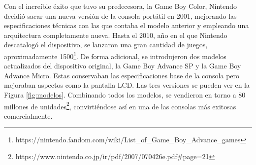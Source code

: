 Con el increíble éxito que tuvo su predecesora, la Game Boy Color, Nintendo decidió sacar una nueva versión de la consola portátil en 2001, mejorando las especificaciones técnicas con las que contaba el modelo anterior y empleando una arquitectura completamente nueva. Hasta el 2010, año en el que Nintendo descatalogó el dispositivo, se lanzaron una gran cantidad de juegos, aproximadamente 1500\footnote{https://nintendo.fandom.com/wiki/List\_of\_Game\_Boy\_Advance\_games}. De forma adicional, se introdujeron dos modelos actualizados del dispositivo original, la Game Boy Advance SP y la Game Boy Advance Micro. Estas conservaban las especificaciones base de la consola pero mejoraban aspectos como la pantalla LCD. Las tres versiones se pueden ver en la Figura \ref{fig:modelos}. Combinando todos los modelos, se vendieron en torno a 80 millones de unidades\footnote{https://www.nintendo.co.jp/ir/pdf/2007/070426e.pdf\#page=21}, convirtiéndose así en una de las consolas más exitosas comercialmente.
